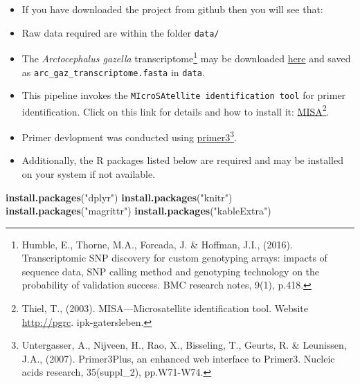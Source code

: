 \documentclass[]{article}
\newenvironment{Shaded}{\begin{snugshade}}{\end{snugshade}}
\newcommand{\KeywordTok}[1]{\textcolor[rgb]{0.13,0.29,0.53}{\textbf{#1}}}
\newcommand{\StringTok}[1]{\textcolor[rgb]{0.31,0.60,0.02}{#1}}
\newcommand{\NormalTok}[1]{#1}
\providecommand{\tightlist}{%
  \setlength{\itemsep}{0pt}\setlength{\parskip}{0pt}}
\let\rmarkdownfootnote\footnote%
\def\footnote{\protect\rmarkdownfootnote}
\begin{document}
\begin{itemize}
\tightlist
\item
  If you have downloaded the project from github then you will see that:
\item
  Raw data required are within the folder \texttt{data/}
\item
  The \emph{Arctocephalus gazella} transcriptome\footnote{Humble, E.,
    Thorne, M.A., Forcada, J. \& Hoffman, J.I., (2016). Transcriptomic
    SNP discovery for custom genotyping arrays: impacts of sequence
    data, SNP calling method and genotyping technology on the
    probability of validation success. BMC research notes, 9(1), p.418.}
  may be downloaded
  \href{http://ramadda.nerc-bas.ac.uk/repository/entry/show/Polar+Data+Centre/NERC-BAS+Datasets/Genomics/Transcriptomes/Arctocephalus_gazella/Arctocephalus_gazella_transcripts.fasta?entryid=synth\%3A2d2268fe-907c-45b0-a493-0a6cab8642e6\%3AL1RyYW5zY3JpcHRvbWVzL0FyY3RvY2VwaGFsdXNfZ2F6ZWxsYS9BcmN0b2NlcGhhbHVzX2dhemVsbGFfdHJhbnNjcmlwdHMuZmFzdGE\%3D}{here}
  and saved as \texttt{arc\_gaz\_transcriptome.fasta} in \texttt{data}.
\item
  This pipeline invokes the
  \texttt{MIcroSAtellite\ identification\ tool} for primer
  identification. Click on this link for details and how to install it:
  \href{http://pgrc.ipk-gatersleben.de/misa/misa.html}{MISA}\footnote{Thiel,
    T., (2003). MISA---Microsatellite identification tool. Website
    \url{http://pgrc}. ipk-gatersleben.}.
\item
  Primer devlopment was conducted using
  \href{http://primer3.sourceforge.net/releases.php}{primer3}\footnote{Untergasser,
    A., Nijveen, H., Rao, X., Bisseling, T., Geurts, R. \& Leunissen,
    J.A., (2007). Primer3Plus, an enhanced web interface to Primer3.
    Nucleic acids research, 35(suppl\_2), pp.W71-W74.}.
\item
  Additionally, the R packages listed below are required and may be
  installed on your system if not available.
\end{itemize}

\begin{Shaded}
\begin{Highlighting}[]
\KeywordTok{install.packages}\NormalTok{(}\StringTok{"dplyr"}\NormalTok{)}
\KeywordTok{install.packages}\NormalTok{(}\StringTok{"knitr"}\NormalTok{)}
\KeywordTok{install.packages}\NormalTok{(}\StringTok{"magrittr"}\NormalTok{)}
\KeywordTok{install.packages}\NormalTok{(}\StringTok{"kableExtra"}\NormalTok{)}
\end{Highlighting}
\end{Shaded}
\end{document}
